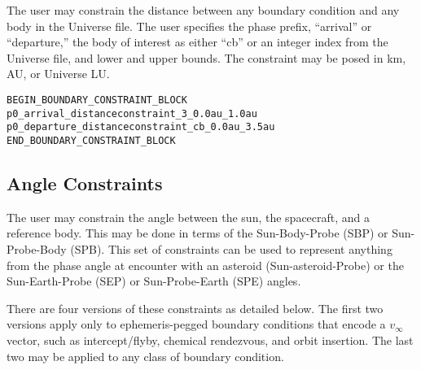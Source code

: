 \documentclass[11pt]{article}
\begin{document}
The user may constrain the distance between any boundary condition and any body in the Universe file. The user specifies the phase prefix, ``arrival'' or ``departure,'' the body of interest as either ``cb'' or an integer index from the Universe file, and lower and upper bounds. The constraint may be posed in km, AU, or Universe LU.

\begin{verbatim}
BEGIN_BOUNDARY_CONSTRAINT_BLOCK
p0_arrival_distanceconstraint_3_0.0au_1.0au
p0_departure_distanceconstraint_cb_0.0au_3.5au
END_BOUNDARY_CONSTRAINT_BLOCK
\end{verbatim}

\subsection{Angle Constraints}
\label{subsec:boundaryAngleConstraint}

The user may constrain the angle between the sun, the spacecraft, and a reference body. This may be done in terms of the Sun-Body-Probe (SBP) or Sun-Probe-Body (SPB). This set of constraints can be used to represent anything from the phase angle at encounter with an asteroid (Sun-asteroid-Probe) or the Sun-Earth-Probe (SEP) or Sun-Probe-Earth (SPE) angles.

There are four versions of these constraints as detailed below. The first two versions apply only to ephemeris-pegged boundary conditions that encode a $v_\infty$ vector, such as intercept/flyby, chemical rendezvous, and orbit insertion. The last two may be applied to any class of boundary condition.
\end{document}
